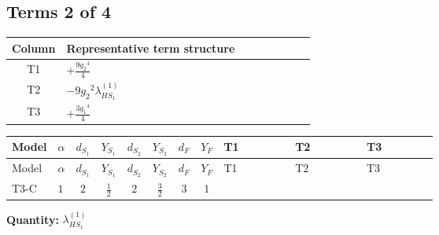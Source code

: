 \documentclass[8pt]{article}
\begin{document}
\begin{landscape}
\subsection*{Terms 2 of 4}
\begin{center}
\begin{tabular}{@{}c >{\raggedright\arraybackslash}p{0.82\linewidth}@{}}
\toprule
Column & Representative term structure \\
\midrule
T1 & \(\displaystyle +\frac{9 {g_2}^4}{4}\) \\
\midrule
T2 & \(\displaystyle -9 {g_2}^2 {\lambda_{HS_1}^{(1)}}\) \\
\midrule
T3 & \(\displaystyle +\frac{3 {g_1}^4}{4}\) \\
\midrule
\bottomrule
\end{tabular}
\end{center}
\smallskip
\tiny
\begin{longtable}{@{}llcccccc >{\raggedright\arraybackslash}p{0.21\linewidth} >{\raggedright\arraybackslash}p{0.21\linewidth} >{\raggedright\arraybackslash}p{0.21\linewidth}@{}}
\toprule
Model & $\alpha$ & $d_{S_1}$ & $Y_{S_1}$ & $d_{S_2}$ & $Y_{S_2}$ & $d_F$ & $Y_F$ & T1 & T2 & T3 \\
\midrule
\endfirsthead
\toprule
Model & $\alpha$ & $d_{S_1}$ & $Y_{S_1}$ & $d_{S_2}$ & $Y_{S_2}$ & $d_F$ & $Y_F$ & T1 & T2 & T3 \\
\midrule
\endhead
T3-C & $1$ & $2$ & $\frac{1}{2}$ & $2$ & $\frac{3}{2}$ & $3$ & $1$ & \scriptsize\adjustbox{max width=\linewidth}{$\begin{gathered} +\frac{9 {g_2}^4}{4}\end{gathered}$} & \scriptsize\adjustbox{max width=\linewidth}{$\begin{gathered} -9 {g_2}^2 {\lambda_{HS_1}^{(1)}}\end{gathered}$} & \scriptsize\adjustbox{max width=\linewidth}{$\begin{gathered} +\frac{3 {g_1}^4}{4}\end{gathered}$} \\
\midrule
\bottomrule
\end{longtable}
\clearpage
\noindent\textbf{Quantity: }$\lambda_{HS_1}^{(1)}$\par\smallskip

\end{landscape}
\end{document}
